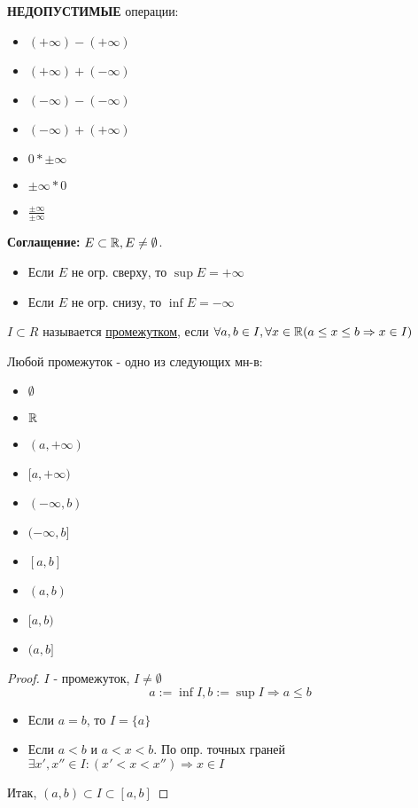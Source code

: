 \textbf{НЕДОПУСТИМЫЕ} операции:
\begin{itemize}
    \item $(+\infty) - (+\infty)$
    \item $(+\infty) + (-\infty)$
    \item $(-\infty) - (-\infty)$
    \item $(-\infty) + (+\infty)$
    \item $0 * \pm \infty$
    \item $\pm \infty * 0$
    \item $\frac{\pm \infty}{\pm \infty}$
\end{itemize}
\textbf{Соглащение: } $E \subset \mathbb{R}, E \neq \emptyset$.
\begin{itemize}
    \item Если $E$ не огр. сверху, то $\sup E = +\infty$
    \item Если $E$ не огр. снизу, то $\inf E = -\infty$
\end{itemize}
\begin{definition}
$I \subset R$ называется \underline{промежутком}, если $\forall a, b \in I, \forall x \in \mathbb{R} (a \leq x \leq b \Rightarrow x \in I)$
\end{definition}
\begin{lemma}
    Любой промежуток - одно из следующих мн-в:
    \begin{itemize}
        \item $\emptyset$
        \item $\mathbb{R}$
        \item $(a, +\infty)$
        \item $[a, +\infty)$
        \item $(-\infty, b)$
        \item $(-\infty, b]$
        \item $[a, b]$
        \item $(a, b)$
        \item $[a, b)$
        \item $(a, b]$
    \end{itemize}
\end{lemma}
\begin{proof}
$I$ - промежуток, $I \neq \emptyset$
\[
a := \inf I, b := \sup I \Rightarrow a \leq b
\] 
\begin{itemize}
    \item Если $a = b$, то $I = \{a\}$
    \item Если $a < b$ и $a < x < b$. По опр. точных граней $\exists x', x'' \in I \colon  (x' < x < x'') \Rightarrow x \in I$
\end{itemize}
Итак, $(a, b) \subset I \subset [a, b]$

\end{proof}

